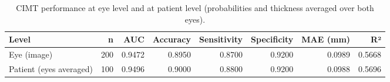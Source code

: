 \begin{table}
\caption{CIMT performance at eye level and at patient level (probabilities and thickness averaged over both eyes).}
\label{tab:eye_vs_patient_level}
\begin{tabular}{lrrrrrrr}
\toprule
Level & n & AUC & Accuracy & Sensitivity & Specificity & MAE (mm) & R² \\
\midrule
Eye (image) & 200 & 0.9472 & 0.8950 & 0.8700 & 0.9200 & 0.0989 & 0.5668 \\
Patient (eyes averaged) & 100 & 0.9496 & 0.9000 & 0.8800 & 0.9200 & 0.0988 & 0.5696 \\
\bottomrule
\end{tabular}
\end{table}
